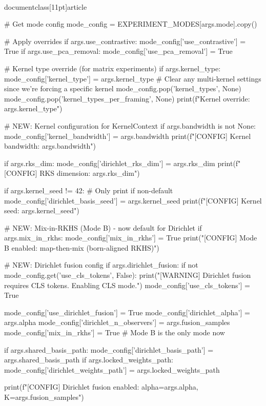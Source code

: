 \\documentclass[11pt]{article}
\begin{document}
\begin{CodeBlock}
    # Get mode config
    mode_config = EXPERIMENT_MODES[args.mode].copy()
    
    # Apply overrides
    if args.use_contrastive:
        mode_config['use_contrastive'] = True
    if args.use_pca_removal:
        mode_config['use_pca_removal'] = True
    
    # Kernel type override (for matrix experiments)
    if args.kernel_type:
        mode_config['kernel_type'] = args.kernel_type
        # Clear any multi-kernel settings since we're forcing a specific kernel
        mode_config.pop('kernel_types', None)
        mode_config.pop('kernel_types_per_framing', None)
        print(f"Kernel override: {args.kernel_type}")
    
    # NEW: Kernel configuration for KernelContext
    if args.bandwidth is not None:
        mode_config['kernel_bandwidth'] = args.bandwidth
        print(f"[CONFIG] Kernel bandwidth: {args.bandwidth}")
    
    if args.rks_dim:
        mode_config['dirichlet_rks_dim'] = args.rks_dim
        print(f"[CONFIG] RKS dimension: {args.rks_dim}")
    
    if args.kernel_seed != 42:  # Only print if non-default
        mode_config['dirichlet_basis_seed'] = args.kernel_seed
        print(f"[CONFIG] Kernel seed: {args.kernel_seed}")
    
    # NEW: Mix-in-RKHS (Mode B) - now default for Dirichlet
    if args.mix_in_rkhs:
        mode_config['mix_in_rkhs'] = True
        print("[CONFIG] Mode B enabled: map-then-mix (born-aligned RKHS)")
    
    # NEW: Dirichlet fusion config
    if args.dirichlet_fusion:
        if not mode_config.get('use_cls_tokens', False):
            print("[WARNING] Dirichlet fusion requires CLS tokens. Enabling CLS mode.")
            mode_config['use_cls_tokens'] = True
        
        mode_config['use_dirichlet_fusion'] = True
        mode_config['dirichlet_alpha'] = args.alpha
        mode_config['dirichlet_n_observers'] = args.fusion_samples
        mode_config['mix_in_rkhs'] = True  # Mode B is the only mode now
        
        if args.shared_basis_path:
            mode_config['dirichlet_basis_path'] = args.shared_basis_path
        if args.locked_weights_path:
            mode_config['dirichlet_weights_path'] = args.locked_weights_path
        
        print(f"[CONFIG] Dirichlet fusion enabled: alpha={args.alpha}, K={args.fusion_samples}")
    

\end{CodeBlock}
\end{document}
